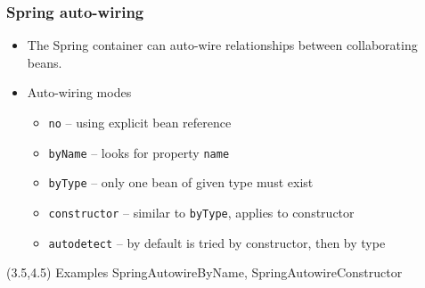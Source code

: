 \documentclass[10pt,xcolor=pdflatex, table]{beamer}
\begin{document}
\begin{frame}\frametitle{Spring auto-wiring}
	\begin{itemize}
		\item The Spring container can auto-wire relationships between collaborating beans.
		\item Auto-wiring modes
          \begin{itemize}
        	\item \texttt{no} -- using explicit bean reference
        	\item \texttt{byName} -- looks for property \texttt{name}
        	\item \texttt{byType} -- only one bean of given type must exist
        	\item \texttt{constructor} -- similar to \texttt{byType}, applies to constructor
        	\item \texttt{autodetect} -- by default is tried by constructor, then by type
          \end{itemize}
	\end{itemize}
\begin{textblock}{15}(3.5,4.5)
    {\footnotesize Examples SpringAutowireByName, SpringAutowireConstructor}
\end{textblock}
\end{frame}
\end{document}
